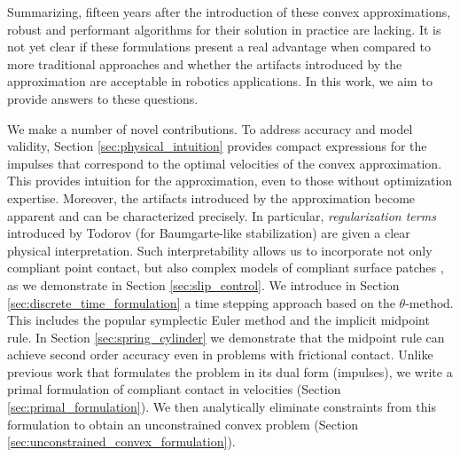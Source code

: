 Summarizing, fifteen years after the introduction of these convex
approximations, robust and performant algorithms for their solution in practice
are lacking. It is not yet clear if these formulations present
a real advantage when compared to more traditional approaches and whether the
artifacts introduced by the approximation are acceptable in robotics
applications. In this work, we aim to provide answers to these questions. 

We make a number of novel contributions. To address accuracy and model validity,
Section \ref{sec:physical_intuition} provides compact expressions for the
impulses that correspond to the optimal velocities of the convex approximation.
This provides intuition for the approximation, even to those without
optimization expertise. Moreover, the artifacts introduced by the approximation
become apparent and can be characterized precisely. In particular,
\emph{regularization terms} introduced by Todorov \cite{bib:todorov2014} (for
Baumgarte-like stabilization) are given a clear physical interpretation. Such
interpretability  allows us to incorporate not only compliant point contact, but
also complex models of compliant surface patches \cite{bib:elandt2019pressure},
as we demonstrate in Section \ref{sec:slip_control}. We introduce in Section
\ref{sec:discrete_time_formulation} a time stepping approach based on the
$\theta\text{-method}$. This includes the popular symplectic Euler method and
the implicit midpoint rule. In Section \ref{sec:spring_cylinder} we demonstrate
that the midpoint rule can achieve second order accuracy even in problems with
frictional contact.
Unlike previous work \cite{bib:anitescu2010,bib:todorov2014} that formulates the
problem in its dual form (impulses), we write a primal formulation of compliant contact
in velocities (Section \ref{sec:primal_formulation}).
We then analytically eliminate constraints from this
formulation to obtain an unconstrained convex problem
(Section \ref{sec:unconstrained_convex_formulation}).

